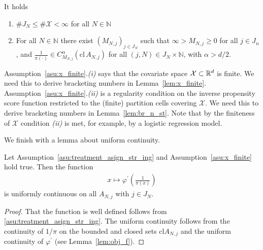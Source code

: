  \begin{assumption}
   \label{asu:x_finite}
   It holds
   \begin{enumerate}[label=(\roman*)]
     \item 
       $\# J_N\le \# \mathcal{X}<\infty$ for all $N\in\mathbb{N}$
\item
  For all $N\in\mathbb{N}$ there exist $(M_{N,j})_{j\in J_N}$ such that $\infty>M_{N,j}\ge 0$ for all $j\in J_n$, and 
  $\frac{1}{\pi(\cdot)}\in C^\alpha_{M_{N,j}}(\mathrm{cl}\,A_{N,j})$ for all $(j,N)\in J_N\times \mathbb{N}$, with $\alpha>d/2$.
   \end{enumerate}
 \end{assumption}
 \begin{remark}
   Assumption~\ref{asu:x_finite}.\textit{(i)} says that the covariate space $\mathcal{X}\subset \mathbb{R}^d$ is finite.
   We need this to derive bracketing numbers in Lemma~\ref{lem:x_finite}.
   Assumption~\ref{asu:x_finite}.\textit{(ii)} is a regularity condition on the inverse propensity score function restricted to the (finite) partition cells covering $\mathcal{X}$.
   We need this to derive bracketing numbers in Lemma~\ref{lem:br_n_st}.
   Note that by the finiteness of $\mathcal{X}$ condition \textit{(ii)} is met, for example, by a logistic regression model.  
 \end{remark}
 We finish with a lemma about uniform continuity.
 \begin{lemma}
   \label{lem:ips_unif_cont}
   Let Assumption~\eqref{asu:treatment_asign_str_ing} and Assumption~\ref{asu:x_finite} hold true.
   Then the function 
   \begin{align*}
     x\mapsto 
     \varphi^{'}
     \left( \frac{1}{\pi(x)} \right)
   \end{align*}
   is uniformly continuous on all $A_{N,j}$ with $j\in J_N$.
 \end{lemma}
 \begin{proof}
   That the function is well defined follows from \eqref{asu:treatment_asign_str_ing}.
   The uniform continuity follows from the continuity of $1/\pi$ on the bounded 
   and closed sets $\mathrm{cl} A_{N,j}$ and the uniform continuity of 
   $
   \varphi^{'}
   $ (see Lemma~\ref{lem:obj_f}).
 \end{proof}
